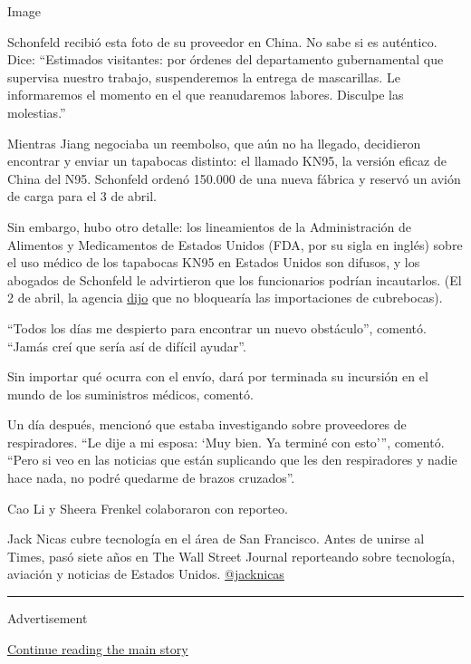 Image

Schonfeld recibió esta foto de su proveedor en China. No sabe si es
auténtico. Dice: ``Estimados visitantes: por órdenes del departamento
gubernamental que supervisa nuestro trabajo, suspenderemos la entrega de
mascarillas. Le informaremos el momento en el que reanudaremos labores.
Disculpe las molestias.''

Mientras Jiang negociaba un reembolso, que aún no ha llegado, decidieron
encontrar y enviar un tapabocas distinto: el llamado KN95, la versión
eficaz de China del N95. Schonfeld ordenó 150.000 de una nueva fábrica y
reservó un avión de carga para el 3 de abril.

Sin embargo, hubo otro detalle: los lineamientos de la Administración de
Alimentos y Medicamentos de Estados Unidos (FDA, por su sigla en inglés)
sobre el uso médico de los tapabocas KN95 en Estados Unidos son difusos,
y los abogados de Schonfeld le advirtieron que los funcionarios podrían
incautarlos. (El 2 de abril, la agencia
\href{https://www.buzzfeednews.com/article/kenbensinger/the-fda-now-says-it-will-allow-imports-of-kn95-masks-an}{dijo}
que no bloquearía las importaciones de cubrebocas).

``Todos los días me despierto para encontrar un nuevo obstáculo'',
comentó. ``Jamás creí que sería así de difícil ayudar''.

Sin importar qué ocurra con el envío, dará por terminada su incursión en
el mundo de los suministros médicos, comentó.

Un día después, mencionó que estaba investigando sobre proveedores de
respiradores. ``Le dije a mi esposa: `Muy bien. Ya terminé con esto''',
comentó. ``Pero si veo en las noticias que están suplicando que les den
respiradores y nadie hace nada, no podré quedarme de brazos cruzados''.

Cao Li y Sheera Frenkel colaboraron con reporteo.

Jack Nicas cubre tecnología en el área de San Francisco. Antes de unirse
al Times, pasó siete años en The Wall Street Journal reporteando sobre
tecnología, aviación y noticias de Estados Unidos.
\href{https://twitter.com/jacknicas?lang=es}{@jacknicas}

\begin{center}\rule{0.5\linewidth}{\linethickness}\end{center}

Advertisement

\protect\hyperlink{after-bottom}{Continue reading the main story}

